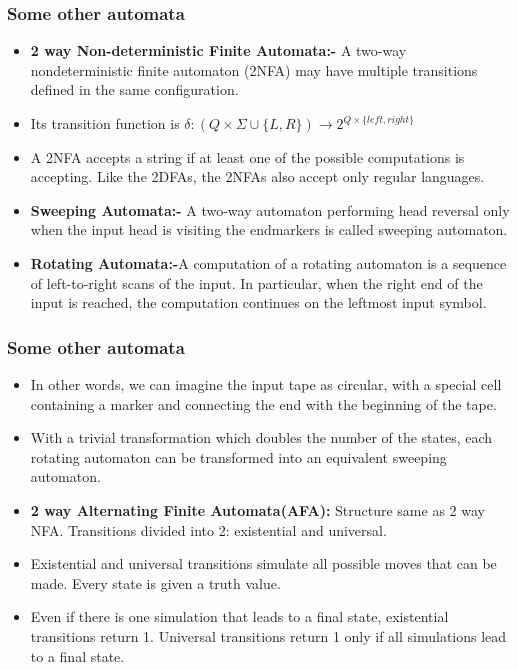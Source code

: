 \documentclass{beamer}
\begin{document}
\begin{frame}
    \frametitle{Some other automata}
    \begin{itemize}
        \item \textbf{2 way Non-deterministic Finite Automata:-} A two-way nondeterministic finite automaton (2NFA) may have multiple transitions defined in the same configuration.
        \item Its transition function is $\delta:(Q \times \Sigma\cup \{L,R\}) \rightarrow 2^{Q\times \{left,right\}}$
        \item A 2NFA accepts a string if at least one of the possible computations is accepting. Like the 2DFAs, the 2NFAs also accept only regular languages. 
        \item \textbf{Sweeping Automata:-} A two-way automaton performing head reversal only when the input head is visiting the endmarkers is
        called sweeping automaton.
        \item \textbf{Rotating Automata:-}A computation of a rotating automaton is a sequence of left-to-right scans of the input. In particular, when
        the right end of the input is reached, the computation continues on the leftmost input symbol. 
        
        
    \end{itemize}
\end{frame}
\begin{frame}
    \frametitle{Some other automata}
    \begin{itemize}
        \item In other words, we can imagine the input tape as circular, with a special cell containing a marker and connecting
        the end with the beginning of the tape.
        \item With a trivial transformation which doubles the number of the
        states, each rotating automaton can be transformed into an equivalent sweeping automaton.
        \item \textbf{2 way Alternating Finite Automata(AFA):} Structure same as 2 way NFA. Transitions divided into 2: existential and universal.
        \item Existential and universal transitions simulate all possible moves that can be made. Every state is given a truth value.
        \item Even if there is one simulation that leads to a final state, existential transitions return 1. Universal transitions return 1 only if all simulations lead to a final state.
        
    \end{itemize}
\end{frame}
\end{document}
